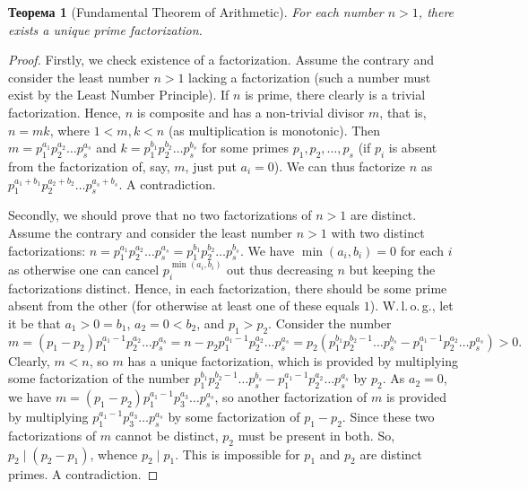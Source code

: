 \documentclass[12pt,notitlepage]{article}
\theoremstyle{plain}
\newtheorem{thm}{Теорема}[section]
\theoremstyle{definition}
\theoremstyle{plain}
\newcommand{\1}{\mathbf{1}}
\newcommand{\0}{\mathbf{0}}
\newcommand{\dvd}{\mathop{\mid}}
\begin{document}
\begin{thm}[Fundamental Theorem of Arithmetic]\label{L4:t14}
	For each number $n > 1$, there exists a unique prime factorization.
\end{thm}
\begin{proof}
	Firstly, we check existence of a factorization. Assume the contrary and consider the least number $n > 1$ lacking a factorization (such a number must exist by the Least Number Principle). If $n$ is prime, there clearly is a trivial factorization. Hence, $n$ is composite and has a non-trivial divisor $m$, that is, $n = m k$, where $1 < m, k < n$ (as multiplication is monotonic). Then $m = p_1^{a_1} p_2^{a_2} \ldots p_s^{a_s}$ and $k = p_1^{b_1} p_2^{b_2} \ldots p_s^{b_s}$ for some primes $p_1, p_2, \ldots, p_s$ (if $p_i$ is absent from the factorization of, say, $m$, just put $a_i = 0$). We can thus factorize $n$ as $p_1^{a_1 + b_1} p_2^{a_2 + b_2} \ldots p_s^{a_s + b_s}$. A contradiction.
	
	Secondly, we should prove that no two factorizations of $n > 1$ are distinct. Assume the contrary and consider the least number $n > 1$ with two distinct factorizations:  $n = p_1^{a_1} p_2^{a_2} \ldots p_s^{a_s} = p_1^{b_1} p_2^{b_2} \ldots p_s^{b_s}$. We have $\min(a_i, b_i) = 0$ for each $i$ as otherwise one can cancel $p_i^{\min(a_i, b_i)}$ out thus decreasing $n$ but keeping the factorizations distinct. Hence, in each factorization, there should be some prime absent from the other (for otherwise at least one of these equals $1$). W.\,l.\,o.\,g., let it be that $a_1 > 0 = b_1$, $a_2 = 0 < b_2$, and $p_1 > p_2$. Consider the number
	$$m = (p_1 - p_2)p^{a_1 - 1}_1 p_2^{a_2} \ldots p_s^{a_s} = n - p_2 p^{a_1 - 1}_1 p_2^{a_2} \ldots p_s^{a_s} = p_2 (p^{b_1}_1 p_2^{b_2 - 1} \ldots p_s^{b_s} - p^{a_1 - 1}_1 p_2^{a_2} \ldots p_s^{a_s}) > 0.$$
	Clearly, $m < n$, so $m$ has a unique factorization, which is provided by multiplying some factorization of the number $p^{b_1}_1 p_2^{b_2 - 1} \ldots p_s^{b_s} - p^{a_1 - 1}_1 p_2^{a_2} \ldots p_s^{a_s}$ by $p_2$. As $a_2 = 0$, we have $m = (p_1 - p_2)p^{a_1 - 1}_1 p_3^{a_3} \ldots p_s^{a_s}$, so another factorization of $m$ is provided by multiplying $p^{a_1 - 1}_1 p_3^{a_3} \ldots p_s^{a_s}$ by some factorization of $p_1 - p_2$. Since these two factorizations of $m$ cannot be distinct, $p_2$ must be present in both. So, $p_2 \dvd (p_2 - p_1)$, whence $p_2 \dvd p_1$. This is impossible for $p_1$ and $p_2$ are distinct primes. A contradiction.
\end{proof}
\end{document}
